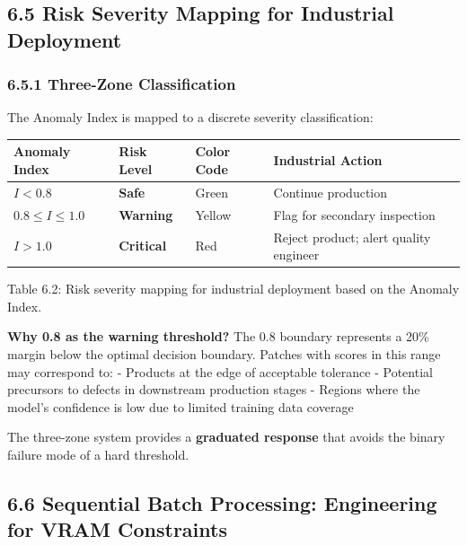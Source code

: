 \documentclass[12pt, a4paper, oneside]{report}
\begin{document}
\bigskip\noindent\hrulefill\bigskip

\subsection{6.5 Risk Severity Mapping for Industrial Deployment}\label{risk-severity-mapping-for-industrial-deployment}

\subsubsection{6.5.1 Three-Zone Classification}\label{three-zone-classification}

The Anomaly Index is mapped to a discrete severity classification:

{\def\LTcaptype{none} %
\begin{longtable}[]{@{}llll@{}}
\toprule\noalign{}
Anomaly Index & Risk Level & Color Code & Industrial Action \\
\midrule\noalign{}
\endhead
\bottomrule\noalign{}
\endlastfoot
\(I < 0.8\) & \textbf{Safe} & Green & Continue production \\
\(0.8 \leq I \leq 1.0\) & \textbf{Warning} & Yellow & Flag for secondary inspection \\
\(I > 1.0\) & \textbf{Critical} & Red & Reject product; alert quality engineer \\
\end{longtable}
}

Table 6.2: Risk severity mapping for industrial deployment based on the Anomaly Index.

\textbf{Why 0.8 as the warning threshold?} The 0.8 boundary represents a 20\% margin below the optimal decision boundary. Patches with scores in this range may correspond to: - Products at the edge of acceptable tolerance - Potential precursors to defects in downstream production stages - Regions where the model's confidence is low due to limited training data coverage

The three-zone system provides a \textbf{graduated response} that avoids the binary failure mode of a hard threshold.

\bigskip\noindent\hrulefill\bigskip

\subsection{6.6 Sequential Batch Processing: Engineering for VRAM Constraints}\label{sequential-batch-processing-engineering-for-vram-constraints}
\end{document}
